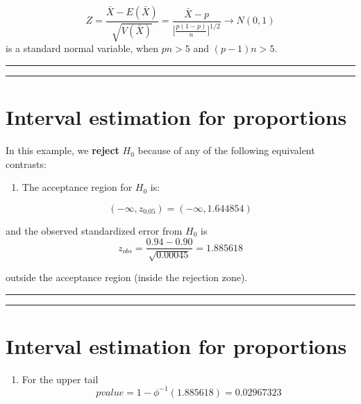 \documentclass[
]{book}
\providecommand{\tightlist}{%
  \setlength{\itemsep}{0pt}\setlength{\parskip}{0pt}}
\begin{document}
\[Z=\frac{\bar{X}-E(\bar{X})}{\sqrt{V(\bar{X})}}= \frac{\bar{X}-p}{\big[\frac{p(1-p)}{n} \big]^{1/2}}\rightarrow N(0,1)\]
is a standard normal variable, when \(pn>5\) and \((p-1)n>5\).

\begin{center}\rule{0.5\linewidth}{0.5pt}\end{center}

\begin{center}\rule{0.5\linewidth}{0.5pt}\end{center}

\hypertarget{interval-estimation-for-proportions-6}{%
\section{Interval estimation for proportions}\label{interval-estimation-for-proportions-6}}

In this example, we \textbf{reject} \(H_0\) because of any of the following equivalent contrasts:

\begin{enumerate}
\def\labelenumi{\arabic{enumi}.}
\tightlist
\item
  The acceptance region for \(H_0\) is:
\end{enumerate}

\[(-\infty, z_{0.05})=( -\infty,  1.644854)\]

and the observed standardized error from \(H_0\) is
\[z_{obs} =  \frac{0.94-0.90}{\sqrt{0.00045}}=1.885618\]

outside the acceptance region (inside the rejection zone).

\begin{center}\rule{0.5\linewidth}{0.5pt}\end{center}

\begin{center}\rule{0.5\linewidth}{0.5pt}\end{center}

\hypertarget{interval-estimation-for-proportions-7}{%
\section{Interval estimation for proportions}\label{interval-estimation-for-proportions-7}}

\begin{enumerate}
\def\labelenumi{\arabic{enumi}.}
\setcounter{enumi}{1}
\tightlist
\item
  For the upper tail \[pvalue=1-\phi^{-1}(1.885618)=0.02967323\]
\end{enumerate}
\end{document}
